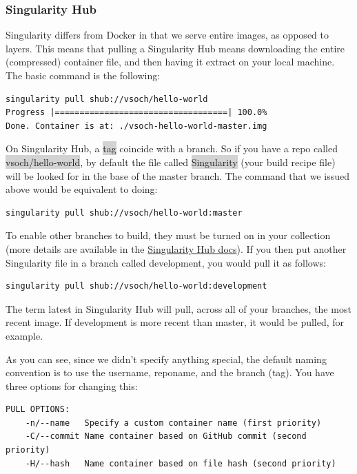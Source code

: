 \documentclass[a4paper]{article}
\newcounter{subsubsubsection}[subsubsection]
\begin{document}
	\subsubsection{Singularity Hub}
	
	Singularity differs from Docker in that we serve entire images, as opposed to layers. This means that pulling a Singularity Hub means downloading the entire (compressed) container file, and then having it extract on your local machine. The basic command is the following:
\begin{lstlisting}[frame=single]
singularity pull shub://vsoch/hello-world
Progress |===================================| 100.0% 
Done. Container is at: ./vsoch-hello-world-master.img
\end{lstlisting}	
	
		
		On Singularity Hub, a \colorbox{lightgray}{tag} coincide with a branch. So if you have a repo called \colorbox{lightgray}{vsoch/hello-world}, by default the file called \colorbox{lightgray}{Singularity} (your build recipe file) will be looked for in the base of the master branch. The command that we issued above would be equivalent to doing:
\begin{lstlisting}[frame=single]
singularity pull shub://vsoch/hello-world:master
\end{lstlisting}
		
		To enable other branches to build, they must be turned on in your collection (more details are available in the \href{https://singularity-hub.org/faq}{Singularity Hub docs}). If you then put another Singularity file in a branch called development, you would pull it as follows:
\begin{lstlisting}[frame=single]
singularity pull shub://vsoch/hello-world:development
\end{lstlisting}

The term latest in Singularity Hub will pull, across all of your branches, the most recent image. If development is more recent than master, it would be pulled, for example.

		
		
		As you can see, since we didn’t specify anything special, the default naming convention is to use the username, reponame, and the branch (tag). You have three options for changing this:

\begin{lstlisting}[frame=single]
PULL OPTIONS:
    -n/--name   Specify a custom container name (first priority)
    -C/--commit Name container based on GitHub commit (second priority)
    -H/--hash   Name container based on file hash (second priority)
\end{lstlisting}
		
\end{document}
